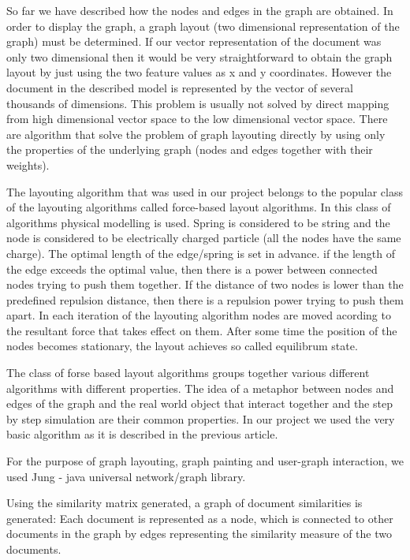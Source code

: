 
So far we have described how the nodes and edges in the graph are obtained. In order to display the graph, a graph layout (two dimensional representation of the graph) must be determined. If our vector representation of the document was only two dimensional then it would be very straightforward to obtain the graph layout
by just using the two feature values as x and y coordinates. However the document in the described model is represented by the vector of several thousands of dimensions. This problem is usually not solved by direct mapping from high dimensional vector space to the low dimensional vector space. There are algorithm that solve the problem of graph layouting directly by using only the properties of the underlying graph (nodes and edges together with their weights).

The layouting algorithm that was used in our project belongs to the popular class of the layouting algorithms called force-based layout algorithms. In this class of algorithms physical modelling is used. Spring is considered to be string and the node is considered to be electrically charged particle (all the nodes have the same charge). The optimal length of the edge/spring is set in advance. if the length of the edge exceeds the optimal value, then there is a power between connected nodes trying to push them together. If the distance of two nodes is lower than the predefined repulsion distance, then there is a repulsion power trying to push them apart. In each iteration of the layouting algorithm nodes are moved acording to the resultant force that takes effect on them. After some time the position of the nodes becomes stationary, the layout achieves so called equilibrum state.

The class of forse based layout algorithms groups together various different algorithms with different properties. The idea of a metaphor between nodes and edges of the graph and the real world object that interact together and the step by step simulation are their common properties. In our project we used the very basic algorithm as it is described in the previous article.

For the purpose of graph layouting, graph painting and user-graph interaction, we used Jung - java universal network/graph library.

Using the similarity matrix generated, a graph of document similarities is generated: Each document is represented as a node, which is connected to other documents in the graph by edges representing the similarity measure of the two documents.


